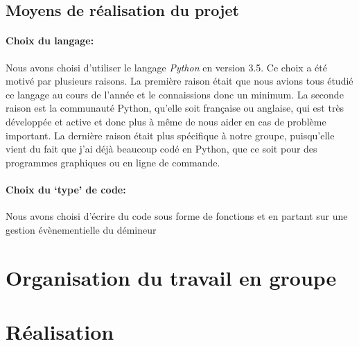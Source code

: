\documentclass[12pt, a4paper]{article}
\begin{document}

\subsection{Moyens de réalisation du projet}

\paragraph{Choix du langage:}
Nous avons choisi d'utiliser le langage \emph{Python} en version 3.5. Ce choix
a été motivé par plusieurs raisons. La première raison était que nous avions
tous étudié ce langage au cours de l'année et le connaissions donc un minimum.
La seconde raison est la communauté Python, qu'elle soit française ou anglaise,
qui est très développée et active et donc plus à même de nous aider en cas
de problème important. La dernière raison était plus spécifique à notre groupe,
puisqu'elle vient du fait que j'ai déjà beaucoup codé en Python, que ce soit
pour des programmes graphiques ou en ligne de commande.

\paragraph{Choix du `type' de code:}
Nous avons choisi d'écrire du code sous forme de fonctions et en partant sur
une gestion évènementielle du démineur



\section{Organisation du travail en groupe}




\section{Réalisation}
\end{document}
